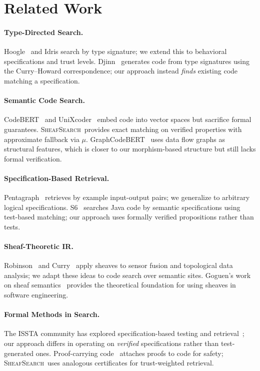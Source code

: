\documentclass[11pt]{article}
\newcommand{\MatchScore}{\mu}
\newcommand{\CodeSearch}{\textsc{SheafSearch}}
\begin{document}
\section{Related Work}\label{sec:related}

\paragraph{Type-Directed Search.}
Hoogle~\cite{Hoogle2004} and Idris search by type signature; we extend
this to behavioral specifications and trust levels.  Djinn~\cite{Djinn2005}
generates code from type signatures using the Curry--Howard
correspondence; our approach instead \emph{finds} existing code matching
a specification.

\paragraph{Semantic Code Search.}
CodeBERT~\cite{CodeBERT2020} and UniXcoder~\cite{UniXcoder2022} embed code into vector spaces
but sacrifice formal guarantees.  \CodeSearch\ provides exact matching
on verified properties with approximate fallback via $\MatchScore$.
GraphCodeBERT~\cite{GraphCodeBERT2021} uses data flow graphs as
structural features, which is closer to our morphism-based structure but
still lacks formal verification.

\paragraph{Specification-Based Retrieval.}
Pentagraph~\cite{Pentagraph2019} retrieves by example input-output
pairs; we generalize to arbitrary logical specifications.
S6~\cite{S62012} searches Java code by semantic specifications using
test-based matching; our approach uses formally verified propositions
rather than tests.

\paragraph{Sheaf-Theoretic IR.}
Robinson~\cite{Robinson2014} and Curry~\cite{Curry2014} apply sheaves to
sensor fusion and topological data analysis; we adapt these ideas to
code search over semantic sites.  Goguen's work on sheaf
semantics~\cite{Goguen1992} provides the theoretical foundation for
using sheaves in software engineering.

\paragraph{Formal Methods in Search.}
The ISSTA community has explored specification-based testing and
retrieval~\cite{ISSTA2020}; our approach differs in operating on
\emph{verified} specifications rather than test-generated ones.
Proof-carrying code~\cite{Necula1997} attaches proofs to code for
safety; \CodeSearch\ uses analogous certificates for trust-weighted
retrieval.
\end{document}
